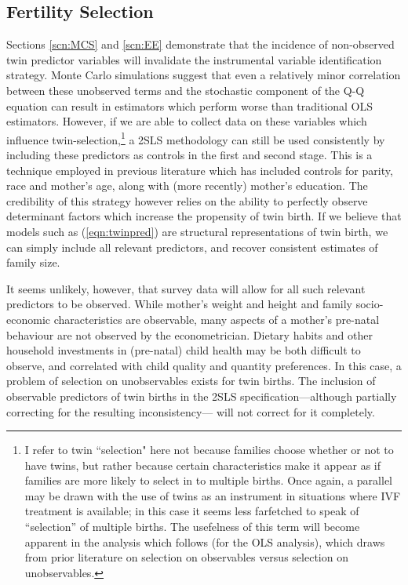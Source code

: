 \documentclass{article}[11pt,subeqn]
\begin{document}
\begin{spacing}{1.5}
\subsection{Fertility Selection}
\label{scn:selection}
Sections \ref{scn:MCS} and \ref{scn:EE} demonstrate that the incidence of non-observed twin predictor variables will invalidate the instrumental variable identification strategy.  
Monte Carlo simulations suggest that even a relatively minor correlation between these unobserved terms and the stochastic component of the Q-Q equation can result in estimators 
which perform worse than traditional OLS estimators.  However, if we are able to collect data on these variables which influence twin-selection,\footnote{I refer to twin ``selection" 
here not because families choose whether or not to have twins, but rather because certain characteristics make it appear as if families are more likely to select in to multiple 
births.  Once again, a parallel may be drawn with the use of twins as an instrument in situations where IVF treatment is available; in this case it seems less farfetched to speak 
of ``selection'' of multiple births.  The usefelness of this term will become apparent in the analysis which follows (for the OLS analysis), which draws from prior literature on 
selection on observables versus selection on unobservables.} a 2SLS methodology can still be used consistently by including these predictors as controls in the first and second 
stage.  This is a technique employed in previous literature which has included controls for parity, race and mother's age, along with (more recently) mother's education.  The 
credibility of this strategy however relies on the ability to perfectly observe determinant factors which increase the propensity of twin birth.  If we believe that models such 
as (\ref{eqn:twinpred}) are structural representations of twin birth, we can simply include all relevant predictors, and recover consistent estimates of family size.

It seems unlikely, however, that survey data will allow for all such relevant predictors to be observed.  While mother's weight and height and family socio-economic characteristics 
are observable, many aspects of a mother's pre-natal behaviour are not observed by the econometrician.  Dietary habits and other household investments in (pre-natal) child health 
may be both difficult to observe, and correlated with child quality and quantity preferences.  In this case, a problem of selection on unobservables exists for twin births.  The 
inclusion of observable predictors of twin births in the 2SLS specification---although partially correcting for the resulting inconsistency--- will not correct for it completely.


\end{spacing}
\end{document}
